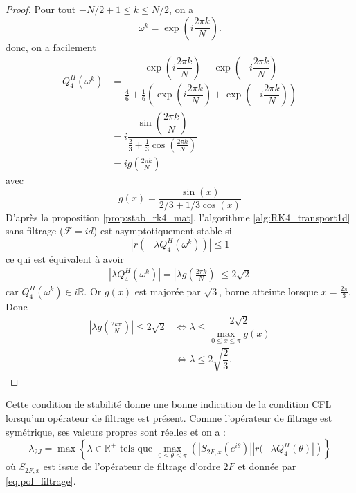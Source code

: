 \begin{proof}
Pour tout $-N/2 + 1 \leq k \leq N/2$, on a
\begin{equation}
\omega^k = \exp \left( i \dfrac{2 \pi k}{N} \right).
\end{equation}
donc, on a facilement
\begin{align*}
Q_4^H(\omega^k) & = \dfrac{\exp \left( i \dfrac{2 \pi k}{N} \right) - \exp \left(- i \dfrac{2 \pi k}{N} \right)}{\frac{4}{6} + \frac{1}{6} \left( \exp \left( i \dfrac{2 \pi k}{N} \right) + \exp \left( -i \dfrac{2 \pi k}{N} \right) \right)} \\
		& = i \dfrac{\sin \left( \dfrac{2 \pi k}{N} \right)}{\frac{2}{3} + \frac{1}{3} \cos \left( \frac{2 \pi k}{N} \right)}\\
		& = i g \left( \frac{2 \pi k}{N} \right)
\end{align*}
avec 
\begin{equation}
g(x) = \dfrac{\sin(x)}{2/3 + 1/3 \cos (x)}
\end{equation}
D'après la proposition \ref{prop:stab_rk4_mat}, l'algorithme \ref{alg:RK4_transport1d} sans filtrage ($\mathcal{F} = id$) est asymptotiquement stable si
\begin{equation}
| r(- \lambda Q_4^H(\omega^k))| \leq 1
\end{equation}
ce qui est équivalent à avoir
\begin{align}
|\lambda Q_4^H(\omega^k)| = |\lambda g \left( \frac{2\pi k}{N} \right)| \leq 2 \sqrt{2}
\end{align}
car $Q_4^H(\omega^k) \in i \mathbb{R}$.
Or $g(x)$ est majorée par $\sqrt{3}$, borne atteinte lorsque $x=\frac{2 \pi}{3}$.
Donc 
\begin{align*}
| \lambda g \left( \frac{2 k \pi}{N} \right)| \leq 2 \sqrt{2} & \Leftrightarrow \lambda \leq \dfrac{2 \sqrt{2}}{\max_{0 \leq x \leq \pi} g(x)} \\
	& \Leftrightarrow \lambda \leq 2 \sqrt{\dfrac{2}{3}}. 
\end{align*}
\end{proof}

Cette condition de stabilité donne une bonne indication de la condition CFL lorsqu'un opérateur de filtrage est présent. Comme l'opérateur de filtrage est symétrique, ses valeurs propres sont réelles et on a :
\begin{equation}
\lambda_{2J} = \max \left\lbrace \lambda \in \mathbb{R}^+ \text{ tels que } \max_{0 \leq \theta \leq \pi} \left(|S_{2F,x}(e^{i \theta})| | r(-\lambda Q_4^H(\theta) | \right) \right\rbrace
\end{equation}
où $S_{2F,x}$ est issue de l'opérateur de filtrage d'ordre $2F$ et donnée par \eqref{eq:pol_filtrage}.

